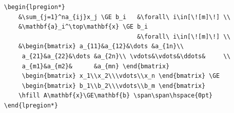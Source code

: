 \documentclass{article}
\begin{document}
\begin{tcolorbox}
	\begin{Verbatim}
\begin{lpregion*}
	&\sum_{j=1}^na_{ij}x_j \GE b_i   &\forall\ i\in[\![m]\!] \\
	&\mathbf{a}_i^\top\mathbf{x} \GE b_i  
	                                 &\forall\ i\in[\![m]\!] \\
	&\begin{bmatrix} a_{11}&a_{12}&\dots &a_{1n}\\
	 a_{21}&a_{22}&\dots &a_{2n}\\ \vdots&\vdots&\ddots&     \\
	 a_{m1}&a_{m2}&      &a_{mn} \end{bmatrix}
	 \begin{bmatrix} x_1\\x_2\\\vdots\\x_n \end{bmatrix} \GE
	 \begin{bmatrix} b_1\\b_2\\\vdots\\b_m \end{bmatrix}
	\hfill A\mathbf{x}\GE\mathbf{b} \span\span\hspace{0pt}
\end{lpregion*}


\end{Verbatim}
\end{tcolorbox}
\end{document}
